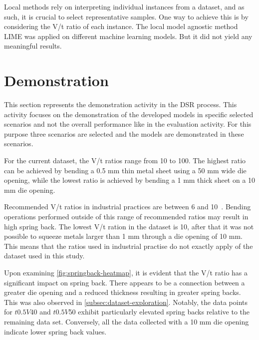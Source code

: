 Local methods rely on interpreting individual instances from a dataset, and as such, it is
crucial to select representative samples.
One way to achieve this is by considering the V/t ratio of each instance.
The local model agnostic method LIME was applied on different machine learning models.
But it did not yield any meaningful results.


\section{Demonstration}\label{sec:demonstration}
This section represents the demonstration activity in the \ac{DSR} process.
This activity focuses on the demonstration of the developed models in specific selected scenarios and not the
overall performance like in the evaluation activity.
For this purpose three scenarios are selected and the models are demonstrated in these scenarios.

For the current dataset, the V/t ratios range from 10 to 100.
The highest ratio can be achieved by bending a 0.5 mm thin metal sheet using a 50 mm wide die opening, while the
lowest ratio is achieved by bending a 1 mm thick sheet on a 10 mm die opening.

Recommended V/t ratios in industrial practices are between 6 and 10~\cite[p.7]{cruz2021application}.
Bending operations performed outside of this range of recommended ratios may result in
high spring back.
The lowest V/t ration in the dataset is 10, after that it was not possible to squeeze metals larger than 1 mm
through a die opening of 10 mm.
This means that the ratios used in industrial practise do not exactly apply of the dataset used in this study.

Upon examining \cref{fig:springback-heatmap}, it is evident that the V/t ratio has a significant impact on
spring back.
There appears to be a connection between a greater die opening and a reduced thickness resulting in greater spring
backs. This was also observed in \cref{subsec:dataset-exploration}.
Notably, the data points for $t0.5 V40$ and $t0.5 V50$ exhibit particularly elevated spring backs relative to the
remaining data set.
Conversely, all the data collected with a 10 mm die opening indicate lower spring back values.

